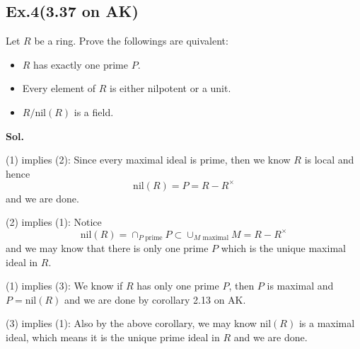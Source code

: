 \documentclass[lang=en,11pt,a4paper,citestyle =authoryear]{elegantpaper}
\begin{document}
\subsection*{Ex.4(3.37 on AK)} 
Let $R$ be a ring. Prove the followings are quivalent:
\begin{itemize}
    \item $R$ has exactly one prime $P$.
    \item Every element of $R$ is either nilpotent or a unit.
    \item $R/\text{nil}(R)$ is a field.
\end{itemize}
\vspace{0.5em}
\textbf{Sol.} \par
(1) implies (2): Since every maximal ideal is prime, then we know $R$ is local and hence
\[
\text{nil}(R) = P  = R-R^{\times}
\]
and we are done.\par
(2) implies (1): Notice
\[
\text{nil}(R) = \cap_{P\text{ prime}}P \subset \cup_{M\text{ maximal}}M = R-R^{\times}
\]
and we may know that there is only one prime $P$ which is the unique maximal ideal in $R$.\par
(1) implies (3): We know if $R$ has only one prime $P$, then $P$ is maximal and $P = \text{nil}(R)$ and we are done by corollary 2.13 on AK.\par
(3) implies (1): Also by the above corollary, we may know $\text{nil}(R)$ is a maximal ideal, which means it is the unique prime ideal in $R$ and we are done.
\par 
\vspace{0.5em}
\end{document}
